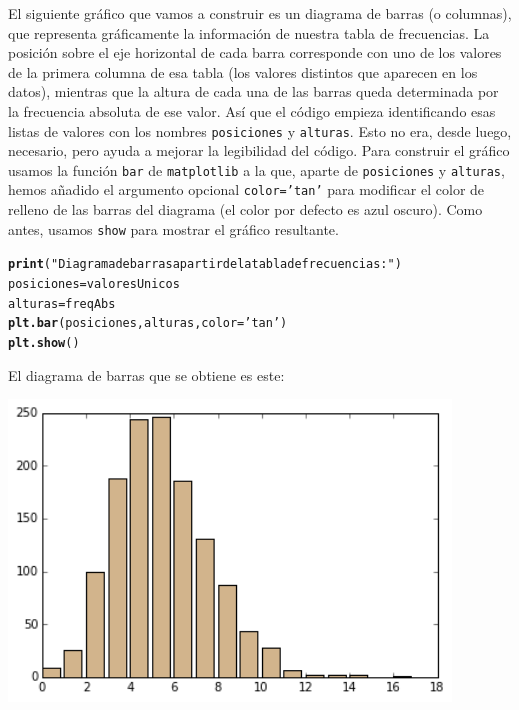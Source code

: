 \documentclass[10pt,a4paper]{article}\usepackage[]{graphicx}\usepackage[]{color}
\makeatletter
\newcommand{\hlstr}[1]{\textcolor[rgb]{0.192,0.494,0.8}{#1}}%
\newcommand{\hlstd}[1]{\textcolor[rgb]{0.345,0.345,0.345}{#1}}%
\newcommand{\hlkwb}[1]{\textcolor[rgb]{0.69,0.353,0.396}{#1}}%
\newcommand{\hlkwc}[1]{\textcolor[rgb]{0.333,0.667,0.333}{#1}}%
\newcommand{\hlkwd}[1]{\textcolor[rgb]{0.737,0.353,0.396}{\textbf{#1}}}%
\newenvironment{kframe}{%
 \def\at@end@of@kframe{}%
 \ifinner\ifhmode%
  \def\at@end@of@kframe{\end{minipage}}%
  \begin{minipage}{\columnwidth}%
 \fi\fi%
 \def\FrameCommand##1{\hskip\@totalleftmargin \hskip-\fboxsep
 \colorbox{shadecolor}{##1}\hskip-\fboxsep
     \hskip-\linewidth \hskip-\@totalleftmargin \hskip\columnwidth}%
 \MakeFramed {\advance\hsize-\width
   \@totalleftmargin\z@ \linewidth\hsize
   \@setminipage}}%
 {\par\unskip\endMakeFramed%
 \at@end@of@kframe}
\newenvironment{knitrout}{}{} %
\makeatother
\begin{document}
El siguiente gráfico que vamos a construir es un diagrama de barras (o columnas), que representa gráficamente la información de nuestra tabla de frecuencias. La posición sobre el eje horizontal de cada barra corresponde con uno de los valores de la primera columna de esa tabla (los valores distintos que aparecen en los datos), mientras que la altura de cada una de las barras queda determinada por la frecuencia absoluta de ese valor. Así que el código empieza identificando esas listas de valores con los nombres {\tt posiciones} y {\tt alturas}. Esto no era, desde luego, necesario, pero ayuda a mejorar la legibilidad del código. Para construir el gráfico usamos la función {\tt bar} de {\tt matplotlib} a la que, aparte de {\tt posiciones} y {\tt alturas}, hemos añadido el argumento opcional {\tt color='tan'} para modificar el color de relleno de las barras del diagrama (el color por defecto es azul oscuro). Como antes, usamos {\tt show} para mostrar el gráfico resultante.
\begin{knitrout}
\color{fgcolor}\begin{kframe}
\begin{alltt}
\hlkwd{print}\hlstd{(}\hlstr{"Diagrama de barras a partir de la tabla de frecuencias:"}\hlstd{)}
\hlstd{posiciones} \hlkwb{=} \hlstd{valoresUnicos}
\hlstd{alturas} \hlkwb{=} \hlstd{freqAbs}
\hlkwd{plt.bar}\hlstd{(posiciones, alturas,} \hlkwc{color}\hlstd{=}\hlstr{'tan'}\hlstd{)}
\hlkwd{plt.show}\hlstd{()}
\end{alltt}
\end{kframe}
\end{knitrout}
El diagrama de barras que se obtiene es este:
\begin{center}
\includegraphics[height=8cm]{../fig/Tut-02-py-04-diagBarras.png}
\end{center}
\end{document}
